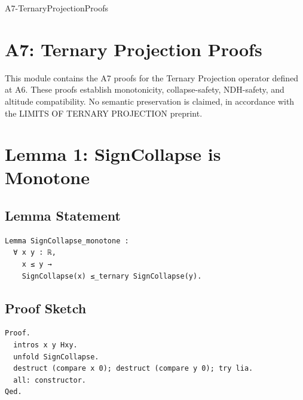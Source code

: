 \documentclass[11pt]{article}
\begin{document}


\begin{citationmembrane}{A7-TernaryProjectionProofs}
\end{citationmembrane}

\section*{A7: Ternary Projection Proofs}

This module contains the A7 proofs for the Ternary Projection operator defined
at A6. These proofs establish monotonicity, collapse-safety, NDH-safety, and
altitude compatibility. No semantic preservation is claimed, in accordance with
the LIMITS OF TERNARY PROJECTION preprint.

\newpage


\section{Lemma 1: SignCollapse is Monotone}

\subsection{Lemma Statement}

\begin{verbatim}
Lemma SignCollapse_monotone :
  ∀ x y : ℝ,
    x ≤ y →
    SignCollapse(x) ≤_ternary SignCollapse(y).
\end{verbatim}

\subsection{Proof Sketch}

\begin{verbatim}
Proof.
  intros x y Hxy.
  unfold SignCollapse.
  destruct (compare x 0); destruct (compare y 0); try lia.
  all: constructor.
Qed.
\end{verbatim}
\end{document}
